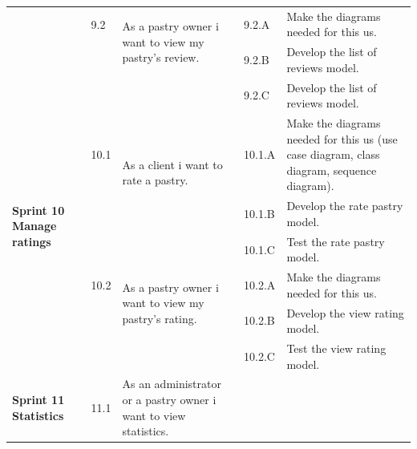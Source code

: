 \documentclass[12pt,a4paper]{report}
\begin{document}
\begin{table}[H]
	\begin{center}

		\setlength\doublerulesep{0.5pt}
		\begin{tabular}{|  p{3cm}|  p{1cm}| p{4cm}|  p{1cm}| p{6cm}|}
			\cline{2-5}  
			
			&                       
			9.2  &  
			\multirow{2}{4cm}{As a pastry owner i want to view my pastry's review.}
			
			&				                      
			9.2.A &                        
			Make the diagrams needed for this \ac{us}.
			\\ 
			\cline{4-5}    
			&                   
			&                                 
			&                        
			9.2.B &                        
			Develop the list of reviews model.
			
			\\ 
			\cline{4-5}    
			&                   
			&                                 
			&                        
			9.2.C &                        
			Develop the list of reviews model.
			\\
			\hline
			\multirow{5}{3cm}{\textbf{Sprint 10} \textbf{Manage ratings} }
			&                       
			10.1  &  
			\multirow{2}{4cm}{As a client i want to rate a pastry.}
			
			&				                      
			10.1.A &                        
			Make the diagrams needed for this \ac{us} (use case diagram, class diagram, sequence diagram).
			\\ 
			\cline{4-5}    
			&                   
			&                                 
			&                        
			10.1.B &                        
			Develop the rate pastry model.
			\\ 
			\cline{4-5}    
			&                   
			&                                 
			&                        
			10.1.C &                        
			Test the rate pastry model.
			\\
			\cline{2-5}  
			
			&                       
			10.2  &  
			\multirow{2}{4cm}{As a pastry owner i want to view my pastry's rating.}
			
			&				                      
			10.2.A &                        
			Make the diagrams needed for this \ac{us}.
			\\ 
			\cline{4-5}    
			&                   
			&                                 
			&                        
			10.2.B &                        
			Develop the view rating model.
			\\ 
			\cline{4-5}    
			&                   
			&                                 
			&                        
			10.2.C &                        
			Test the view rating model.
			\\
			\hline
			\multirow{5}{3cm}{\textbf{Sprint 11} \textbf{Statistics} }
			&                       
			11.1  &  
			\multirow{2}{4cm}{As an administrator or a pastry owner i want to view statistics.}
			

\end{tabular}
\end{center}
\end{table}
\end{document}
